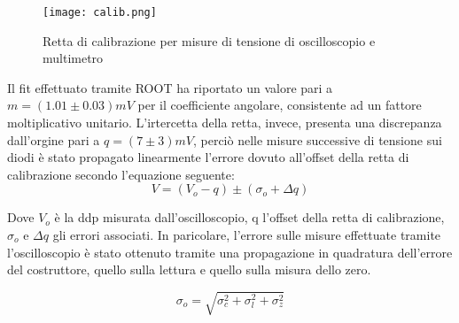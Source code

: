 \documentclass{article}
\begin{document}
\begin{figure}
\centering
\texttt{[image: calib.png]}
\caption{Retta di calibrazione per misure di tensione di oscilloscopio e multimetro} 
\end{figure}
Il fit effettuato tramite ROOT ha riportato un valore pari a \(m=(1.01\pm0.03)mV\) per il coefficiente angolare, consistente ad un fattore moltiplicativo unitario. L’irtercetta della retta, invece, presenta una discrepanza dall’orgine pari a \(q=(7\pm3)mV\), perciò nelle misure successive di tensione sui diodi è stato propagato linearmente l’errore dovuto all’offset della retta di calibrazione secondo l’equazione seguente:
\begin{equation}
V = (V_o - q)\pm(\sigma_o+\Delta q)
\end{equation}

Dove \(V_o\) è la ddp misurata dall’oscilloscopio, q l’offset della retta di calibrazione, \(\sigma_o\) e \(\Delta q\) gli errori associati. In paricolare, l’errore sulle misure effettuate tramite l’oscilloscopio è stato ottenuto tramite una propagazione in quadratura dell’errore del costruttore, quello sulla lettura e quello sulla misura dello zero.

\begin{equation}
\sigma_o = \sqrt{\sigma_c^2+\sigma_l^2+\sigma_z^2}
\end{equation}
\end{document}
